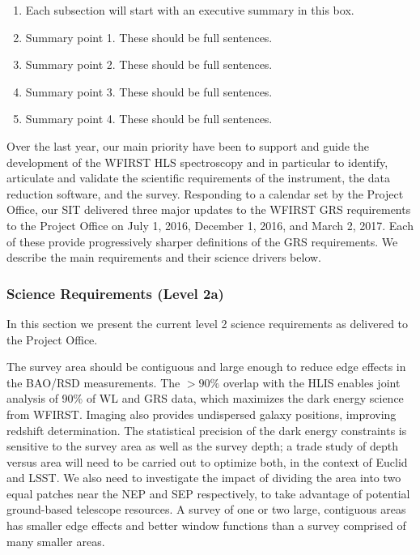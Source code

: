  \begin{summaryii}
 \begin{enumerate}
 \item Each subsection will start with an executive summary in this box.
 \item Summary point 1. These should be full sentences.
 \item Summary point 2. These should be full sentences.
 \item Summary point 3. These should be full sentences.
 \item Summary point 4. These should be full sentences.
 \end{enumerate}
 \end{summaryii}

Over the last year, our main priority have been to support and guide the development of the WFIRST HLS spectroscopy and in particular to identify, articulate and validate the scientific requirements of the instrument, the data reduction software, and the survey. Responding to a calendar set by the Project Office, our SIT delivered three major updates to the WFIRST GRS requirements to the Project Office on July 1, 2016, December 1, 2016, and March 2, 2017. Each of these provide progressively sharper definitions of the  GRS requirements. We describe the main requirements and their science drivers below.


 \subsubsection{Science Requirements (Level 2a)} In this section we present the current level 2 science requirements as delivered to the Project Office.


 The survey area should be contiguous and large enough to reduce edge effects in
 the BAO/RSD measurements.  The $>90\%$ overlap with the HLIS enables joint
 analysis of 90\% of WL and GRS data, which maximizes the dark energy science
 from WFIRST.  Imaging also provides undispersed galaxy positions, improving
 redshift determination.  The statistical precision of the dark energy
 constraints is sensitive to the survey area as well as the survey depth; a trade
 study of depth versus area will need to be carried out to optimize both, in the
 context of Euclid and LSST. We also need to investigate the impact of dividing
 the area into two equal patches near the NEP and SEP respectively, to take
 advantage of potential ground-based telescope resources.  A survey of one or
 two large, contiguous areas has smaller edge effects and better window functions
 than a survey comprised of many smaller areas.

